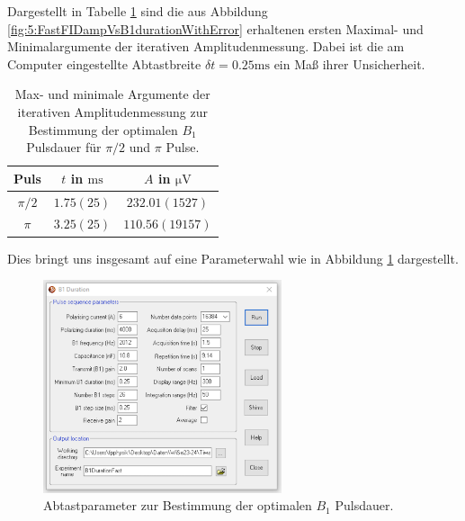 \documentclass[../../main.tex]{subfiles}
\begin{document}
            Dargestellt in Tabelle \ref{tab:5:OptiB1Duration} sind die aus Abbildung \ref{fig:5:FastFIDampVsB1durationWithError} erhaltenen ersten Maximal- und Minimalargumente der iterativen Amplitudenmessung. Dabei ist die am Computer eingestellte Abtastbreite $\delta t = 0.25\si{\ms}$ ein Maß ihrer Unsicherheit.

            \begin{table}[H]
                \centering
                \begin{tabular}{c|cc}
                    Puls & $t$ in $\si{\ms}$ & $A$ in $\si{\micro\volt}$ \\
                    \hline\hline
                    $\pi/2$ & $1.75(25)$ & $232.01(1527)$ \\
                    $\pi$ & $3.25(25)$ & $110.56(19157)$
                \end{tabular}
                \caption{Max- und minimale Argumente der iterativen Amplitudenmessung zur Bestimmung der optimalen $B_1$ Pulsdauer für $\pi/2$ und $\pi$ Pulse.}
                \label{tab:5:OptiB1Duration}
            \end{table}
            Dies bringt uns insgesamt auf eine Parameterwahl wie in Abbildung \ref{fig:5.2:Abtastparameter} dargestellt.
            \begin{figure}[H]
                \centering
                \includegraphics[width=7cm]{Bilddateien/5/B1Duration_Abtastparameter.png}
                \caption{Abtastparameter zur Bestimmung der optimalen $B_1$ Pulsdauer.}
                \label{fig:5.2:Abtastparameter}
            \end{figure}
\end{document}
